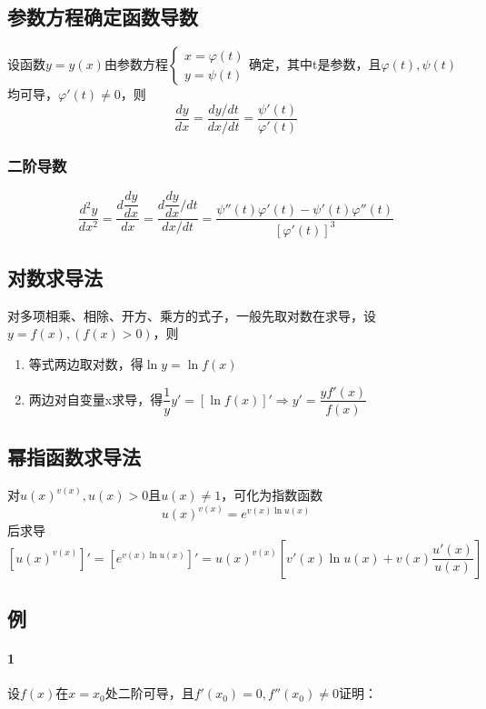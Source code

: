 \subsection{参数方程确定函数导数}

设函数\(y = y(x)\)由参数方程\(\begin{cases}
x = \varphi(t) \\ 
y = \psi(t)
\end{cases}\)确定，其中t是参数，且\(\varphi(t), \psi(t)\)均可导，\(\varphi'(t) \neq 0\)，则\[\dfrac{dy}{dx} = \dfrac{dy/dt}{dx/dt} = \dfrac{\psi'(t)}{\varphi'(t)}\]

\subsubsection{二阶导数}

\[\dfrac{d^2y}{dx^2} = \dfrac{d\dfrac{dy}{dx}}{dx} = \dfrac{d\dfrac{dy}{dx} / dt}{dx / dt} = \dfrac{\psi''(t)\varphi'(t) - \psi'(t)\varphi''(t)}{[\varphi'(t)]^3}\]

\subsection{对数求导法}

对多项相乘、相除、开方、乘方的式子，一般先取对数在求导，设\(y = f(x), (f(x) > 0)\)，则\begin{enumerate}
    \item 等式两边取对数，得\(\ln y = \ln f(x)\)
    \item 两边对自变量x求导，得\(\dfrac{1}{y}y' = [\ln f(x)]' \Rightarrow y' = \dfrac{yf'(x)}{f(x)}\)
\end{enumerate}


\subsection{幂指函数求导法}

对\(u(x)^{v(x)}, u(x) > 0\)且\(u(x) \neq 1\)，可化为指数函数\[u(x)^{v(x)} = e^{v(x)\ln u(x)}\]后求导\[[u(x)^{v(x)}]' = [e^{v(x)\ln u(x)}]' = u(x)^{v(x)}[v'(x)\ln u(x) + v(x)\dfrac{u'(x)}{u(x)}]\]




\subsection{例}

\paragraph{1}
设\(f(x)\)在\(x = x_0\)处二阶可导，且\(f'(x_0) = 0, f''(x_0) \neq 0\)证明：

